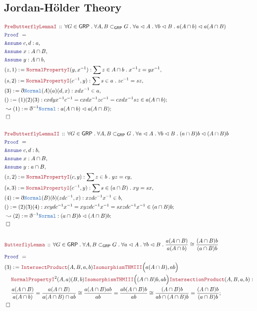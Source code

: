 \documentclass[12pt]{scrartcl}
\newcommand{\TYPE}[1]{\textcolor{NavyBlue}{\mathtt{#1}}}
\newcommand{\LOGIC}[1]{\textcolor{Blue}{\mathtt{#1}}}
\newcommand{\THM}[1]{\textcolor{Maroon}{\mathtt{#1}}}
\renewcommand{\.}{\; . \;}
\newcommand{\de}{: \kern 0.1pc =}
\newcommand{\Theorem}[2]{& \THM{#1} \, :: \, #2 \\ & \Proof = \\ }
\newcommand{\NewLine}{\\ & \kern 1pc}
\newcommand{\Page}[1]{ \begin{align*} #1 \end{align*}   }
\newcommand{ \bd }{ \ByDef }
\newcommand{\Say}[3]{& #1 \de #2 : #3, \\}
\newcommand{\Conclude}[3]{& #1 \de #2 : #3; \\}
\newcommand{\DeriveConclude}[3]{& \leadsto #1 \de #2 : #3 ; \\}
\newcommand{\Assume}[2]{& \LOGIC{Assume} \; #1 : #2, \\}
\newcommand{\QED}{\; \square}
\newcommand{\EndProof}{& \QED \\}
\newcommand{\ByDef}{\eth}
\newcommand{\Proof}{\LOGIC{Proof} \; }
\newcommand{\Sgrp}{\subset_{\mathsf{GRP}}}
\newcommand{\Nrml}{\vartriangleleft}
\newcommand{\GRP}{\mathsf{GRP}}
\begin{document}
\subsection{Jordan-H\"{o}lder Theory }
\Page{
	\Theorem{PreButterflyLemmaI}{ \forall G \in \GRP \. \forall A,B \Sgrp G \. \forall a \Nrml A \. \forall b \Nrml B \.    
		 a(A \cap b) \Nrml a(A \cap B)  }
	\Assume{c,d}{a}
	\Assume{x}{A \cap B}
	\Assume{y}{A \cap b}
	\Say{(z,1)}{\THM{NormalPropertyI}(y,x^{-1})}{\sum z \in A \cap b \. x^{-1}z = yx^{-1}}
	\Say{(s,2)}{\THM{NormalPropertyI}(c^{-1},y)}{\sum s \in a \.  zc^{-1} = sz}
	\Say{(3)}{\bd \TYPE{Normal}(A)(a)(d,x)}{xdx^{-1} \in a}
	\Conclude{()}{(1)(2)(3)}
	{    cxdyx^{-1}c^{-1}  = cxdx^{-1}zc^{-1} = cxdx^{-1}sz \in a(A \cap b)    }
	\DeriveConclude{(1)}{\bd^{-1}\TYPE{Normal}}{   a(A \cap b) \Nrml a(A \cap B)    }
	\EndProof
	\\
	\Theorem{PreButterflyLemmaII}{ \forall G \in \GRP \. \forall A,B \Sgrp G \. \forall a \Nrml A \. \forall b \Nrml B \.    
		(a \cap B )b \Nrml (A \cap B)b}
	\Assume{c,d}{b}
	\Assume{x}{A \cap B}
	\Assume{y}{a \cap B}
	\Say{(z,2)}{\THM{NormalPropertyI}(c,y)}{\sum z \in b \. y z   =  c y}
	\Say{(s,3)}{\THM{NormalPropertyI}(c^{-1},y)}{\sum s \in (a \cap B) \. xy = sx }
	\Say{(4)}{\bd \TYPE{Normal}(B)(b)(zdc^{-1},x)}{xzdc^{-1}x^{-1} \in b}
	\Conclude{()}{(2)(3)(4)}{  xcydc^{-1}x^{-1} = xyzdc^{-1}x^{-1} = sxzdc^{-1}x^{-1} \in (a \cap B)b    }
	\DeriveConclude{(2)}{ \bd^{-1} \TYPE{Normal}  }{(a \cap B)b \Nrml (A \cap B)b }
	\EndProof
	\\
	\Theorem{ButterflyLemma}{ \forall G \in \GRP \. \forall A,B \Sgrp G \. \forall a \Nrml A \. \forall b \Nrml B \.    
		\frac{a(A \cap B)}{ a(A \cap b)} \cong \frac{(A \cap B )b}{(a \cap B)b}
	}	
	\Conclude{(3)}{ \THM{IntersectProduct}(A,B,a,b) \THM{IsomorphismTHMIII}\Big(a(A \cap B), ab\Big) 
		\NewLine
		\THM{NormalPropertyI}^2(A,a)(B,b) \THM{IsomorphismTHMIII}\Big((A \cap B)b, ab\Big)
		\THM{IntersectionProduct}(A,B,a,b)
	}{  \NewLine
		\frac{a(A \cap B)}{  a(A \cap b) } = 
		\frac{a(A \cap B)}{ a(A \cap B) \cap ab  } \cong   
		\frac{a(A \cap B)ab}{ ab  } = \frac{ab(A \cap B)b}{ab} \cong
		\frac{(A \cap B)b}{ ab \cap (A \cap B)b} = 
		\frac{(A \cap B)b}{ (a \cap B)b}
	}
	\EndProof
}
\end{document}
